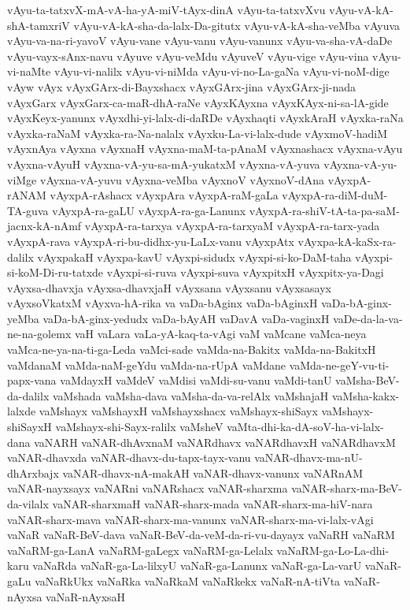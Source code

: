 {vAyu-ta-tatxvX-mA-vA-ha-yA-miV-tAyx-dinA
vAyu-ta-tatxvXvu
vAyu-vA-kA-shA-tamxriV
vAyu-vA-kA-sha-da-lalx-Da-gitutx
vAyu-vA-kA-sha-veMba
vAyuva
vAyu-va-na-ri-yavoV
vAyu-vane
vAyu-vanu
vAyu-vanunx
vAyu-va-sha-vA-daDe
vAyu-vayx-sAnx-navu
vAyuve
vAyu-veMdu
vAyuveV
vAyu-vige
vAyu-vina
vAyu-vi-naMte
vAyu-vi-nalilx
vAyu-vi-niMda
vAyu-vi-no-La-gaNa
vAyu-vi-noM-dige
vAyw
vAyx
vAyxGArx-di-Bayxshacx
vAyxGArx-jina
vAyxGArx-ji-nada
vAyxGarx
vAyxGarx-ca-maR-dhA-raNe
vAyxKAyxna
vAyxKAyx-ni-sa-lA-gide
vAyxKeyx-yanunx
vAyxdhi-yi-lalx-di-daRDe
vAyxhaqti
vAyxkAraH
vAyxka-raNa
vAyxka-raNaM
vAyxka-ra-Na-nalalx
vAyxku-La-vi-lalx-dude
vAyxmoV-hadiM
vAyxnAya
vAyxna
vAyxnaH
vAyxna-maM-ta-pAnaM
vAyxnashacx
vAyxna-vAyu
vAyxna-vAyuH
vAyxna-vA-yu-sa-mA-yukatxM
vAyxna-vA-yuva
vAyxna-vA-yu-viMge
vAyxna-vA-yuvu
vAyxna-veMba
vAyxnoV
vAyxnoV-dAna
vAyxpA-rANAM
vAyxpA-rAshacx
vAyxpAra
vAyxpA-raM-gaLa
vAyxpA-ra-diM-duM-TA-guva
vAyxpA-ra-gaLU
vAyxpA-ra-ga-Lanunx
vAyxpA-ra-shiV-tA-ta-pa-saM-jacnx-kA-nAmf
vAyxpA-ra-tarxya
vAyxpA-ra-tarxyaM
vAyxpA-ra-tarx-yada
vAyxpA-rava
vAyxpA-ri-bu-didhx-yu-LaLx-vanu
vAyxpAtx
vAyxpa-kA-kaSx-ra-dalilx
vAyxpakaH
vAyxpa-kavU
vAyxpi-sidudx
vAyxpi-si-ko-DaM-taha
vAyxpi-si-koM-Di-ru-tatxde
vAyxpi-si-ruva
vAyxpi-suva
vAyxpitxH
vAyxpitx-ya-Dagi
vAyxsa-dhavxja
vAyxsa-dhavxjaH
vAyxsana
vAyxsanu
vAyxsasayx
vAyxsoVkatxM
vAyxva-hA-rika
va
vaDa-bAginx
vaDa-bAginxH
vaDa-bA-ginx-yeMba
vaDa-bA-ginx-yedudx
vaDa-bAyAH
vaDavA
vaDa-vaginxH
vaDe-da-la-va-ne-na-golemx
vaH
vaLara
vaLa-yA-kaq-ta-vAgi
vaM
vaMcane
vaMca-neya
vaMca-ne-ya-na-ti-ga-Leda
vaMci-sade
vaMda-na-Bakitx
vaMda-na-BakitxH
vaMdanaM
vaMda-naM-geYdu
vaMda-na-rUpA
vaMdane
vaMda-ne-geY-vu-ti-papx-vana
vaMdayxH
vaMdeV
vaMdisi
vaMdi-su-vanu
vaMdi-tanU
vaMsha-BeV-da-dalilx
vaMshada
vaMsha-dava
vaMsha-da-va-relAlx
vaMshajaH
vaMsha-kakx-lalxde
vaMshayx
vaMshayxH
vaMshayxshacx
vaMshayx-shiSayx
vaMshayx-shiSayxH
vaMshayx-shi-Sayx-ralilx
vaMsheV
vaMta-dhi-ka-dA-soV-ha-vi-lalx-dana
vaNARH
vaNAR-dhAvxnaM
vaNARdhavx
vaNARdhavxH
vaNARdhavxM
vaNAR-dhavxda
vaNAR-dhavx-du-tapx-tayx-vanu
vaNAR-dhavx-ma-nU-dhArxbajx
vaNAR-dhavx-nA-makAH
vaNAR-dhavx-vanunx
vaNARnAM
vaNAR-nayxsayx
vaNARni
vaNARshacx
vaNAR-sharxma
vaNAR-sharx-ma-BeV-da-vilalx
vaNAR-sharxmaH
vaNAR-sharx-mada
vaNAR-sharx-ma-hiV-nara
vaNAR-sharx-mava
vaNAR-sharx-ma-vanunx
vaNAR-sharx-ma-vi-lalx-vAgi
vaNaR
vaNaR-BeV-dava
vaNaR-BeV-da-veM-da-ri-vu-dayayx
vaNaRH
vaNaRM
vaNaRM-ga-LanA
vaNaRM-gaLegx
vaNaRM-ga-Lelalx
vaNaRM-ga-Lo-La-dhi-karu
vaNaRda
vaNaR-ga-La-lilxyU
vaNaR-ga-Lanunx
vaNaR-ga-La-varU
vaNaR-gaLu
vaNaRkUkx
vaNaRka
vaNaRkaM
vaNaRkekx
vaNaR-nA-tiVta
vaNaR-nAyxsa
vaNaR-nAyxsaH
}
